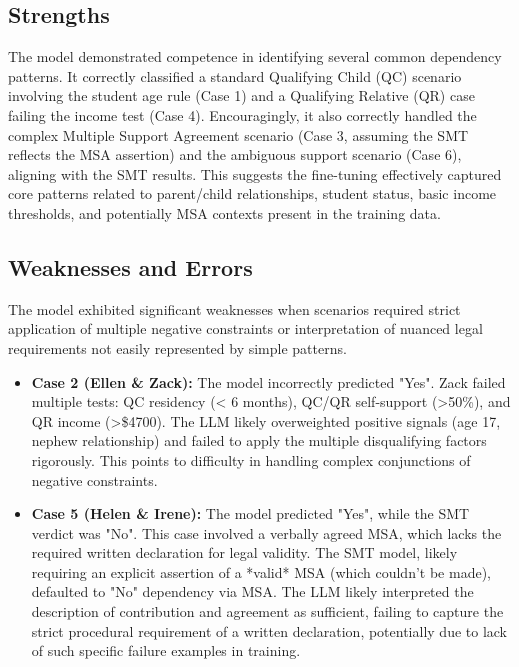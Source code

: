 \documentclass[11pt, letterpaper]{article}
\begin{document}
\subsection*{Strengths}
The model demonstrated competence in identifying several common dependency patterns. It correctly classified a standard Qualifying Child (QC) scenario involving the student age rule (Case 1) and a Qualifying Relative (QR) case failing the income test (Case 4). Encouragingly, it also correctly handled the complex Multiple Support Agreement scenario (Case 3, assuming the SMT reflects the MSA assertion) and the ambiguous support scenario (Case 6), aligning with the SMT results. This suggests the fine-tuning effectively captured core patterns related to parent/child relationships, student status, basic income thresholds, and potentially MSA contexts present in the training data.

\subsection*{Weaknesses and Errors}
The model exhibited significant weaknesses when scenarios required strict application of multiple negative constraints or interpretation of nuanced legal requirements not easily represented by simple patterns.
\begin{itemize}
    \item \textbf{Case 2 (Ellen \& Zack):} The model incorrectly predicted "Yes". Zack failed multiple tests: QC residency (< 6 months), QC/QR self-support (>50\%), and QR income (>\$4700). The LLM likely overweighted positive signals (age 17, nephew relationship) and failed to apply the multiple disqualifying factors rigorously. This points to difficulty in handling complex conjunctions of negative constraints.
    \item \textbf{Case 5 (Helen \& Irene):} The model predicted "Yes", while the SMT verdict was "No". This case involved a verbally agreed MSA, which lacks the required written declaration for legal validity. The SMT model, likely requiring an explicit assertion of a *valid* MSA (which couldn't be made), defaulted to "No" dependency via MSA. The LLM likely interpreted the description of contribution and agreement as sufficient, failing to capture the strict procedural requirement of a written declaration, potentially due to lack of such specific failure examples in training.
\end{itemize}
\end{document}
